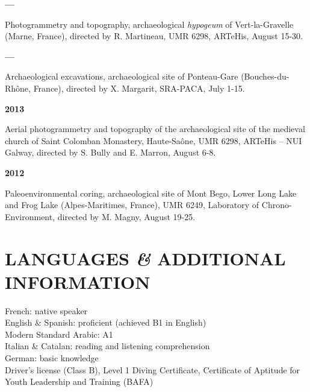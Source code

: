 \documentclass{article}
\newcommand{\fr}[1]{} %
\newcommand{\en}[1]{#1}   %
\begin{document}
\smallbreak
\textbf{---}
\fr{Photogrammétrie et topographie, \textit{hypogée} archéologique de Vert-la-Gravelle (Marne, France), dir. R. Martineau, UMR 6298, ARTeHis, 15-30 août.}
\en{Photogrammetry and topography, archaeological \textit{hypogeum} of Vert-la-Gravelle (Marne, France), directed by R. Martineau, UMR 6298, ARTeHis, August 15-30.}

\smallbreak
\textbf{---}
\fr{Fouilles archéologiques, site archéologique de Ponteau-Gare (Bouches-du-Rhône, France), dir. X. Margarit, SRA-PACA, 1-15 juillet.}
\en{Archaeological excavations, archaeological site of Ponteau-Gare (Bouches-du-Rhône, France), directed by X. Margarit, SRA-PACA, July 1-15.}

\smallbreak
\textbf{2013}
\fr{Photogrammétrie aérienne et topographie du site archéologique de l'église médiévale du monastère de Saint Colomban, Haute-Saône, UMR 6298, ARTeHis -- NUI Galway, dir. S. Bully et E. Marron, 6-8 août.}
\en{Aerial photogrammetry and topography of the archaeological site of the medieval church of Saint Colomban Monastery, Haute-Saône, UMR 6298, ARTeHis -- NUI Galway, directed by S. Bully and E. Marron, August 6-8.}

\smallbreak
\textbf{2012}
\fr{Carottage paléoenvironnemental, site archéologique du mont Bego, Lac Long Inférieur et Lac des Grenouilles (Alpes-Maritimes, France), UMR 6249, Laboratoire Chrono-Environnement, dir. M. Magny, 19-25 août.}
\en{Paleoenvironmental coring, archaeological site of Mont Bego, Lower Long Lake and Frog Lake (Alpes-Maritimes, France), UMR 6249, Laboratory of Chrono-Environment, directed by M. Magny, August 19-25.}

\section*{\fr{LANGUES \textit{\&} INFORMATIONS COMPLÉMENTAIRES}\en{LANGUAGES \textit{\&} ADDITIONAL INFORMATION}}

\fr{Français : langue maternelle \\
Anglais \& Espagnol : bon niveau (obtenu B1 en Anglais) \\
Arabe standard moderne : A1 \\
Italien \& Catalan : compréhension écrite et orale \\
Allemand : notions \\

Permis de conduire (permis B), Niveau 1 de plongée, Diplôme de Capacité d'Animation (BAFA)}
\en{French: native speaker \\
English \& Spanish: proficient (achieved B1 in English) \\
Modern Standard Arabic: A1 \\
Italian \& Catalan: reading and listening comprehension \\
German: basic knowledge \\

Driver's license (Class B), Level 1 Diving Certificate, Certificate of Aptitude for Youth Leadership and Training (BAFA)}
\end{document}
